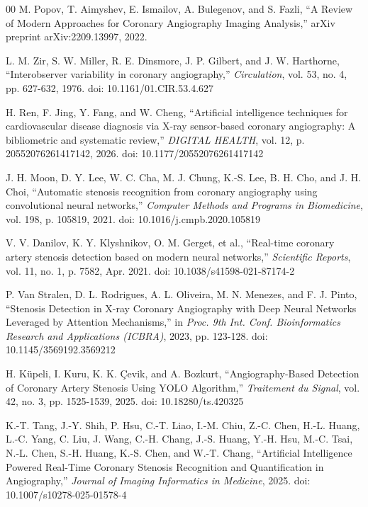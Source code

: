 \documentclass[conference]{IEEEtran}
\begin{document}
\begin{thebibliography}{00}
 M. Popov, T. Aimyshev, E. Ismailov, A. Bulegenov, and S. Fazli, ``A Review of Modern Approaches for Coronary Angiography Imaging Analysis,'' arXiv preprint arXiv:2209.13997, 2022.

 L. M. Zir, S. W. Miller, R. E. Dinsmore, J. P. Gilbert, and J. W. Harthorne, ``Interobserver variability in coronary angiography,'' \textit{Circulation}, vol. 53, no. 4, pp. 627-632, 1976. doi: 10.1161/01.CIR.53.4.627

 H. Ren, F. Jing, Y. Fang, and W. Cheng, ``Artificial intelligence techniques for cardiovascular disease diagnosis via X-ray sensor-based coronary angiography: A bibliometric and systematic review,'' \textit{DIGITAL HEALTH}, vol. 12, p. 20552076261417142, 2026. doi: 10.1177/20552076261417142

 J. H. Moon, D. Y. Lee, W. C. Cha, M. J. Chung, K.-S. Lee, B. H. Cho, and J. H. Choi, ``Automatic stenosis recognition from coronary angiography using convolutional neural networks,'' \textit{Computer Methods and Programs in Biomedicine}, vol. 198, p. 105819, 2021. doi: 10.1016/j.cmpb.2020.105819

 V. V. Danilov, K. Y. Klyshnikov, O. M. Gerget, et al., ``Real-time coronary artery stenosis detection based on modern neural networks,'' \textit{Scientific Reports}, vol. 11, no. 1, p. 7582, Apr. 2021. doi: 10.1038/s41598-021-87174-2

 P. Van Stralen, D. L. Rodrigues, A. L. Oliveira, M. N. Menezes, and F. J. Pinto, ``Stenosis Detection in X-ray Coronary Angiography with Deep Neural Networks Leveraged by Attention Mechanisms,'' in \textit{Proc. 9th Int. Conf. Bioinformatics Research and Applications (ICBRA)}, 2023, pp. 123-128. doi: 10.1145/3569192.3569212

 H. K\"upeli, I. Kuru, K. K. \c{C}evik, and A. Bozkurt, ``Angiography-Based Detection of Coronary Artery Stenosis Using YOLO Algorithm,'' \textit{Traitement du Signal}, vol. 42, no. 3, pp. 1525-1539, 2025. doi: 10.18280/ts.420325

 K.-T. Tang, J.-Y. Shih, P. Hsu, C.-T. Liao, I.-M. Chiu, Z.-C. Chen, H.-L. Huang, L.-C. Yang, C. Liu, J. Wang, C.-H. Chang, J.-S. Huang, Y.-H. Hsu, M.-C. Tsai, N.-L. Chen, S.-H. Huang, K.-S. Chen, and W.-T. Chang, ``Artificial Intelligence Powered Real-Time Coronary Stenosis Recognition and Quantification in Angiography,'' \textit{Journal of Imaging Informatics in Medicine}, 2025. doi: 10.1007/s10278-025-01578-4


\end{thebibliography}
\end{document}
